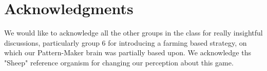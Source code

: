 \section{Acknowledgments}
\label{sec:ack}

We would like to acknowledge all the other groups in the class for really insightful 
discussions, particularly group 6 for introducing a farming based strategy, on which 
our Pattern-Maker brain was partially based upon. We acknowledge ths "Sheep" reference 
organism for changing our perception about this game.
